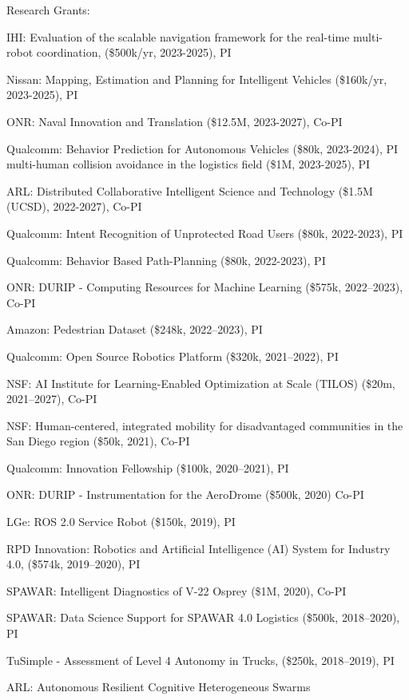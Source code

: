 \documentclass{article}
\begin{document}
\begin{cv}
\begin{cvlist}{Research Grants:}
  \item IHI: Evaluation of the scalable navigation framework for the real-time
  multi-robot coordination, (\$500k/yr, 2023-2025), PI
  \item Nissan: Mapping, Estimation and Planning for Intelligent Vehicles
  (\$160k/yr, 2023-2025), PI
  \item ONR: Naval Innovation and Translation (\$12.5M, 2023-2027), Co-PI
  \item Qualcomm: Behavior Prediction for Autonomous Vehicles (\$80k, 2023-2024), PI
  multi-human collision avoidance in the logistics field (\$1M, 2023-2025), PI
  \item ARL: Distributed Collaborative Intelligent Science and Technology (\$1.5M
  (UCSD), 2022-2027), Co-PI
  \item Qualcomm: Intent Recognition of Unprotected Road Users (\$80k, 2022-2023),
  PI
  \item Qualcomm: Behavior Based Path-Planning (\$80k, 2022-2023), PI
  \item ONR: DURIP - Computing Resources for Machine Learning (\$575k, 2022--2023),
  Co-PI
  \item Amazon: Pedestrian Dataset (\$248k, 2022--2023), PI
\item Qualcomm: Open Source Robotics Platform (\$320k, 2021--2022), PI
\item NSF: AI Institute for Learning-Enabled Optimization at Scale
  (TILOS) (\$20m, 2021--2027), Co-PI
\item NSF: Human-centered, integrated mobility for disadvantaged
  communities in the San Diego region (\$50k, 2021), Co-PI
\item Qualcomm: Innovation Fellowship (\$100k, 2020--2021), PI
\item ONR: DURIP - Instrumentation for the AeroDrome (\$500k, 2020) Co-PI
\item LGe: ROS 2.0 Service Robot (\$150k, 2019), PI
\item RPD Innovation: Robotics and Artificial Intelligence (AI) System for 
  Industry 4.0, (\$574k, 2019--2020), PI 
\item SPAWAR: Intelligent Diagnostics of V-22 Osprey (\$1M, 2020), Co-PI
\item SPAWAR: Data Science Support for SPAWAR 4.0 Logistics (\$500k,
  2018--2020), PI
\item TuSimple - Assessment of Level 4 Autonomy in Trucks,  (\$250k,
  2018--2019), PI
\item ARL: Autonomous Resilient Cognitive Heterogeneous Swarms

\end{cvlist}
\end{cv}
\end{document}

